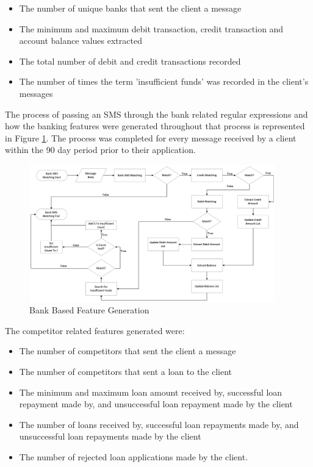 \begin{itemize}
    \item The number of unique banks that sent the client a message
    \item The minimum and maximum debit transaction, credit transaction and account balance values extracted
    \item The total number of debit and credit transactions recorded
    \item The number of times the term 'insufficient funds' was recorded in the client's messages
\end{itemize}

\vspace{10pt}

The process of passing an SMS through the bank related regular expressions and how the banking features were generated throughout that process is represented in Figure \ref{fig:bank_features}. The process was completed for every message received by a client within the 90 day period prior to their application. 

\vspace{10pt}

\begin{figure}[!htb]
\centering
\includegraphics[width=0.95\textwidth]{images/bank_feats.png}
\caption{Bank Based Feature Generation}
\label{fig:bank_features}
\end{figure}

\vspace{10pt}

\newpage

The competitor related features generated were:

\begin{itemize}
    \item The number of competitors that sent the client a message
    \item The number of competitors that sent a loan to the client
    \item The minimum and maximum loan amount received by, successful loan repayment made by, and unsuccessful loan repayment made by the client
    \item The number of loans received by, successful loan repayments made by, and unsuccessful loan repayments made by the client
    \item The number of rejected loan applications made by the client. 
\end{itemize}

